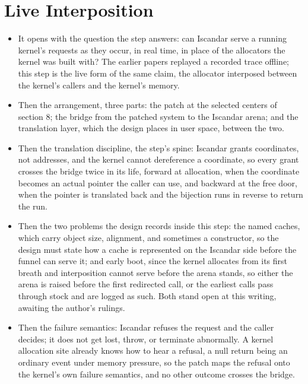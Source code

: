 \documentclass[11pt]{article}
\begin{document}
\section{Live Interposition}

\begin{itemize}
\item It opens with the question the step answers: can Iscandar serve a running kernel's requests as they occur, in real time, in place of the allocators the kernel was built with? The earlier papers replayed a recorded trace offline; this step is the live form of the same claim, the allocator interposed between the kernel's callers and the kernel's memory.
\item Then the arrangement, three parts: the patch at the selected centers of section 8; the bridge from the patched system to the Iscandar arena; and the translation layer, which the design places in user space, between the two.
\item Then the translation discipline, the step's spine: Iscandar grants coordinates, not addresses, and the kernel cannot dereference a coordinate, so every grant crosses the bridge twice in its life, forward at allocation, when the coordinate becomes an actual pointer the caller can use, and backward at the free door, when the pointer is translated back and the bijection runs in reverse to return the run.
\item Then the two problems the design records inside this step: the named caches, which carry object size, alignment, and sometimes a constructor, so the design must state how a cache is represented on the Iscandar side before the funnel can serve it; and early boot, since the kernel allocates from its first breath and interposition cannot serve before the arena stands, so either the arena is raised before the first redirected call, or the earliest calls pass through stock and are logged as such. Both stand open at this writing, awaiting the author's rulings.
\item Then the failure semantics: Iscandar refuses the request and the caller decides; it does not get lost, throw, or terminate abnormally. A kernel allocation site already knows how to hear a refusal, a null return being an ordinary event under memory pressure, so the patch maps the refusal onto the kernel's own failure semantics, and no other outcome crosses the bridge.

\end{itemize}
\end{document}
